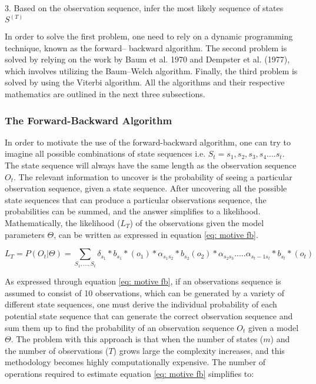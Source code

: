     3. Based on the observation sequence, infer the most likely sequence of states $S^{(T)}$
\label{subsection: MLE}
 
In order to solve the first problem, one need to rely on a dynamic programming technique, known as the forward–
backward algorithm. The second problem is solved by relying on the work by Baum et al. 1970 and Dempster et al. (1977), which involves utilizing the Baum–Welch
algorithm. Finally, the third problem is solved by using the Viterbi algorithm. All the algorithms and their respective mathematics are outlined in the next three subsections. 
 
\subsubsection{The Forward-Backward Algorithm}
\label{Section: Forward backward}
In order to motivate the use of the forward-backward algorithm, one can try to imagine all possible combinations of state sequences i.e. $S_t = s_1, s_2, s_3, s_4....s_t$. The state sequence will always have the same length as the observation sequence $O_t$. The relevant information to uncover is the probability of seeing a particular observation sequence, given a state sequence. After uncovering all the possible state sequences that can produce a particular observations sequence, the probabilities can be summed, and the answer simplifies to a likelihood. Mathematically, the likelihood ($L_T$) of the observations given the model parameters $\Theta$, can be written as expressed in equation \ref{eq: motive fb}.

\begin{equation}
    L_T = P(O_t|\Theta) = \sum_{S_1,\ldots,S_t} \delta_{s_1}*b_{s_1}*(o_1) * \alpha_{s_1s_2} * b_{s_2}(o_2)*\alpha_{s_2s_3} .....\alpha_{s_t-1 s_t}*b_{s_t}*(o_t)
    \label{eq: motive fb}
\end{equation}

As expressed through equation \ref{eq: motive fb}, if an observations sequence is assumed to consist of 10 observations, which can be generated by a variety of different state sequences, one must derive the individual probability of each potential state sequence that can generate the correct observation sequence and sum them up to find the probability of  an observation sequence $O_t$ given a model $\Theta$. The problem with this approach is that when the number of states ($m$) and the number of observations ($T$) grows large the complexity increases, and this methodology becomes highly computationally expensive. The number of operations required to estimate equation \ref{eq: motive fb} simplifies to:

